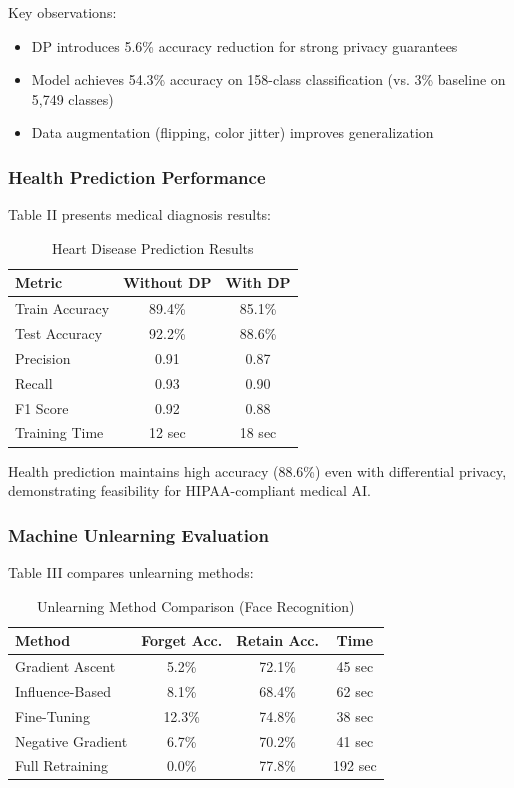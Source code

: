 \documentclass[conference]{IEEEtran}
\begin{document}
Key observations:
\begin{itemize}
    \item DP introduces 5.6\% accuracy reduction for strong privacy guarantees
    \item Model achieves 54.3\% accuracy on 158-class classification (vs. 3\% baseline on 5,749 classes)
    \item Data augmentation (flipping, color jitter) improves generalization
\end{itemize}

\subsubsection{Health Prediction Performance}

Table II presents medical diagnosis results:

\begin{table}[h]
\centering
\caption{Heart Disease Prediction Results}
\begin{tabular}{@{}lcc@{}}
\toprule
\textbf{Metric} & \textbf{Without DP} & \textbf{With DP} \\ \midrule
Train Accuracy & 89.4\% & 85.1\% \\
Test Accuracy & 92.2\% & 88.6\% \\
Precision & 0.91 & 0.87 \\
Recall & 0.93 & 0.90 \\
F1 Score & 0.92 & 0.88 \\
Training Time & 12 sec & 18 sec \\
\bottomrule
\end{tabular}
\end{table}

Health prediction maintains high accuracy (88.6\%) even with differential privacy, demonstrating feasibility for HIPAA-compliant medical AI.

\subsubsection{Machine Unlearning Evaluation}

Table III compares unlearning methods:

\begin{table}[h]
\centering
\caption{Unlearning Method Comparison (Face Recognition)}
\begin{tabular}{@{}lccc@{}}
\toprule
\textbf{Method} & \textbf{Forget Acc.} & \textbf{Retain Acc.} & \textbf{Time} \\ \midrule
Gradient Ascent & 5.2\% & 72.1\% & 45 sec \\
Influence-Based & 8.1\% & 68.4\% & 62 sec \\
Fine-Tuning & 12.3\% & 74.8\% & 38 sec \\
Negative Gradient & 6.7\% & 70.2\% & 41 sec \\
Full Retraining & 0.0\% & 77.8\% & 192 sec \\
\bottomrule
\end{tabular}
\end{table}
\end{document}
